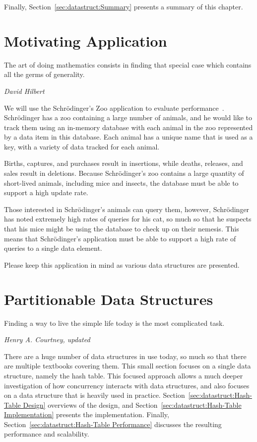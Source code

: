 Finally, Section~\ref{sec:datastruct:Summary}
presents a summary of this chapter.

\section{Motivating Application}
\label{sec:datastruct:Motivating Application}
%
\epigraph{The art of doing mathematics consists in finding that special
	  case which contains all the germs of generality.}
	 {\emph{David Hilbert}}

We will use the Schr\"odinger's Zoo application to evaluate
performance~\cite{McKenney:2013:SDS:2483852.2483867}.
Schr\"odinger has a zoo containing a large number of animals, and
he would like to track them using an in-memory database with
each animal in the zoo represented by a data item in this database.
Each animal has a unique name that is used as a key, with a variety
of data tracked for each animal.

Births, captures, and purchases result in insertions, while deaths,
releases, and sales result in deletions.
Because Schr\"odinger's zoo contains a large quantity of short-lived
animals, including mice and insects, the database must be able to
support a high update rate.

Those interested in Schr\"odinger's animals can query them, however,
Schr\"odinger has noted extremely high rates of queries for his cat,
so much so that he suspects that his mice might be using the database
to check up on their nemesis.
This means that Schr\"odinger's application must be able to support a
high rate of queries to a single data element.

Please keep this application in mind as various data structures are presented.

\section{Partitionable Data Structures}
\label{sec:datastruct:Partitionable Data Structures}
%
\epigraph{Finding a way to live the simple life today is the most
	  complicated task.}
	 {\emph{Henry A. Courtney, updated}}

There are a huge number of data structures in use today, so much so
that there are multiple textbooks covering them.
This small section focuses
on a single data structure, namely the hash table.
This focused approach allows a much deeper investigation of how concurrency
interacts with data structures, and also focuses on a data structure
that is heavily used in practice.
Section~\ref{sec:datastruct:Hash-Table Design}
overviews of the design, and
Section~\ref{sec:datastruct:Hash-Table Implementation}
presents the implementation.
Finally,
Section~\ref{sec:datastruct:Hash-Table Performance}
discusses the resulting performance and scalability.

